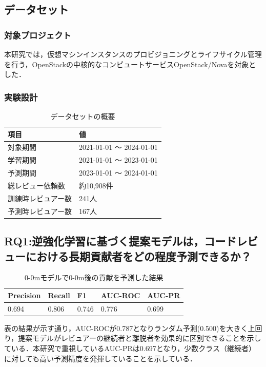 \documentclass[submit,techrep,noauthor]{ipsj}
\begin{document}
\subsection{データセット}
\subsubsection{対象プロジェクト}
本研究では，仮想マシンインスタンスのプロビジョニングとライフサイクル管理を行う，OpenStackの中核的なコンピュートサービスOpenStack/Novaを対象とした．
\subsubsection{実験設計}
\begin{table}[h]
    \centering
    \caption{データセットの概要}
    \begin{tabularx}{\columnwidth}{XX}
        \hline
        項目 & 値 \\
        \hline
        対象期間 & 2021-01-01 ～ 2024-01-01 \\
        学習期間 & 2021-01-01 ～ 2023-01-01 \\
        予測期間 & 2023-01-01 ～ 2024-01-01 \\
        \hline
        総レビュー依頼数 & 約10,908件 \\
        訓練時レビュアー数 & 241人 \\
        予測時レビュアー数 & 167人 \\
        \hline
    \end{tabularx}
    \label{table:dataset}
\end{table}




\subsection{RQ1:逆強化学習に基づく提案モデルは，コードレビューにおける長期貢献者をどの程度予測できるか？}
\begin{table}[h]
    \centering
    \caption{0-0mモデルで0-0m後の貢献を予測した結果}
    \begin{tabularx}{\columnwidth}{XXXXX}
        \hline
       Precision & Recall & F1 & AUC-ROC & AUC-PR \\
       \hline
       0.694  & 0.806 & 0.746 & 0.776 & 0.699 \\ 
       \hline
    \end{tabularx}
\end{table}
表の結果が示す通り，AUC-ROCが0.787となりランダム予測(0.500)を大きく上回り，提案モデルがレビュアーの継続者と離脱者を効果的に区別できることを示している．本研究で重視しているAUC-PRは0.697となり，少数クラス（継続者）に対しても高い予測精度を発揮していることを示している．
\end{document}
